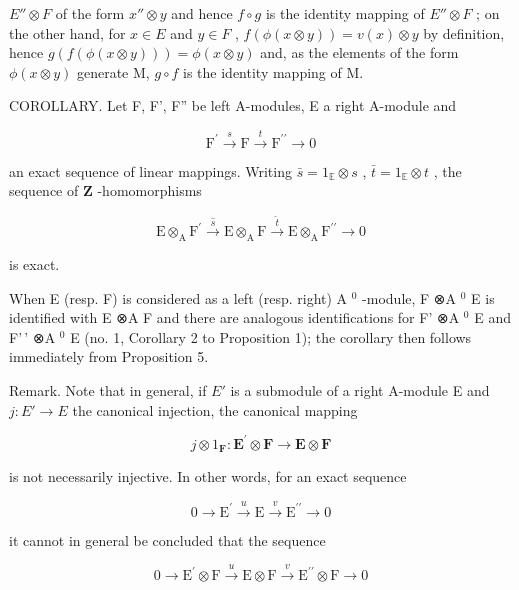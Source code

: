 \(E'' \otimes F\) of the form \(x'' \otimes y\) and hence \(f \circ g\) is the identity mapping of \(E'' \otimes F\) ; on the other hand, for \(x \in E\) and \(y \in F\) , \(f(\phi(x \otimes y)) = v(x) \otimes y\) by definition, hence \(g(f(\phi(x \otimes y))) = \phi(x \otimes y)\) and, as the elements of the form \(\phi(x \otimes y)\) generate M, \(g \circ f\) is the identity mapping of M.

COROLLARY. Let F, F', F'' be left A-modules, E a right A-module and

\[
\mathrm{F} ^ {\prime} \stackrel {s} {\longrightarrow} \mathrm{F} \stackrel {t} {\longrightarrow} \mathrm{F} ^ {\prime \prime} \longrightarrow 0\tag{16}
\]

an exact sequence of linear mappings. Writing \(\bar{s} = 1_{\mathbb{E}} \otimes s\) , \(\bar{t} = 1_{\mathbb{E}} \otimes t\) , the sequence of \(\mathbf{Z}\) -homomorphisms

\[
\mathrm{E} \otimes_ {\mathrm{A}} \mathrm{F} ^ {\prime} \stackrel {\hat {s}} {\longrightarrow} \mathrm{E} \otimes_ {\mathrm{A}} \mathrm{F} \stackrel {\hat {t}} {\longrightarrow} \mathrm{E} \otimes_ {\mathrm{A}} \mathrm{F} ^ {\prime \prime} \longrightarrow 0\tag{17}
\]

is exact.

When E (resp. F) is considered as a left (resp. right) A \(^{0}\) -module, F ⊗A \(^{0}\) E is identified with E ⊗A F and there are analogous identifications for F' ⊗A \(^{0}\) E and F'\,' ⊗A \(^{0}\) E (no. 1, Corollary 2 to Proposition 1); the corollary then follows immediately from Proposition 5.

Remark. Note that in general, if \(E'\) is a submodule of a right A-module E and \(j:E'\to E\) the canonical injection, the canonical mapping

\[
j \otimes 1 _ {\mathbf {F}}: \mathbf {E} ^ {\prime} \otimes \mathbf {F} \rightarrow \mathbf {E} \otimes \mathbf {F}
\]

is not necessarily injective. In other words, for an exact sequence

\[
0 \longrightarrow \mathrm{E} ^ {\prime} \stackrel {u} {\longrightarrow} \mathrm{E} \stackrel {v} {\longrightarrow} \mathrm{E} ^ {\prime \prime} \longrightarrow 0\tag{18}
\]

it cannot in general be concluded that the sequence

\[
0 \longrightarrow \mathrm{E} ^ {\prime} \otimes \mathrm{F} \stackrel {u} {\longrightarrow} \mathrm{E} \otimes \mathrm{F} \stackrel {v} {\longrightarrow} \mathrm{E} ^ {\prime \prime} \otimes \mathrm{F} \longrightarrow 0\tag{19}
\]

